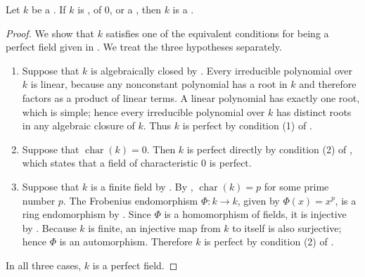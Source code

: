 \begin{proposition} \label{proposition:any_field_that_is_algebraically_closed_characteristic_zero_or_finite_is_perfect}
Let $k$ be a . 
If $k$ is , of  $0$, or a , then $k$ is a .
\end{proposition}
\begin{proof} 
We show that $k$ satisfies one of the equivalent conditions for being a perfect field given in . We treat the three hypotheses separately.

\begin{enumerate}
    \item Suppose that $k$ is algebraically closed by . Every irreducible polynomial over $k$ is linear, because any nonconstant polynomial has a root in $k$ and therefore factors as a product of linear terms. A linear polynomial has exactly one root, which is simple; hence every irreducible polynomial over $k$ has distinct roots in any algebraic closure of $k$. Thus $k$ is perfect by condition (1) of .

    \item Suppose that $\operatorname{char}(k) = 0$. Then $k$ is perfect directly by condition (2) of , which states that a field of characteristic $0$ is perfect.

    \item Suppose that $k$ is a finite field by . By , $\operatorname{char}(k) = p$ for some prime number $p$. The Frobenius endomorphism $\Phi : k \to k$, given by $\Phi(x) = x^p$, is a ring endomorphism by . Since $\Phi$ is a homomorphism of fields, it is injective by . Because $k$ is finite, an injective map from $k$ to itself is also surjective; hence $\Phi$ is an automorphism. Therefore $k$ is perfect by condition (2) of .
\end{enumerate}
In all three cases, $k$ is a perfect field.
\end{proof}